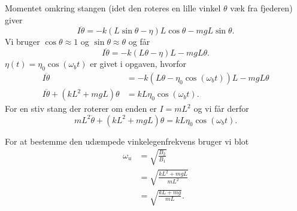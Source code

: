 \begin{derivation}
  Momentet omkring stangen (idet den roteres en lille vinkel $\theta$ væk fra fjederen) giver
  \[ 
  I \ddot{\theta} = - k \left( L \sin \theta - \eta \right)L \cos \theta - mg L \sin \theta
  .\]
  Vi bruger $\cos \theta \approx 1$ og $\sin \theta \approx \theta$ og får
  \[ 
    I \ddot{ \theta} = - k \left( L \theta - \eta \right) L - mgL \theta
  .\]
  $\eta (t) = \eta_0 \cos \left( \omega_b t \right)$ er givet i opgaven, hvorfor
  \begin{align*}
    I \ddot{ \theta} &= - k \left( L \theta - \eta_0 \cos \left( \omega_b t \right) \right) L - mgL \theta \\
    I \ddot{ \theta} + \left( k L^2 + mgL \right) \theta &= kL \eta_0 \cos \left( \omega_b t \right)
  .\end{align*}
  For en stiv stang der roterer om enden er $I = m L^2$ og vi får derfor
  \[ 
  m L^2 \ddot{\theta} + \left( kL^2 + mgL \right)\theta = kL \eta_0 \cos \left( \omega_b t \right)
  .\]
  
  For at bestemme den udæmpede vinkelegenfrekvens bruger vi blot
  \begin{align*}
    \omega_u &= \sqrt{\frac{B_2}{B_1}} \\
             &= \sqrt{\frac{k L^2 + mgL}{mL^2}} \\
             &= \sqrt{\frac{kL + mg}{mL}}
  .\end{align*}
\end{derivation}

